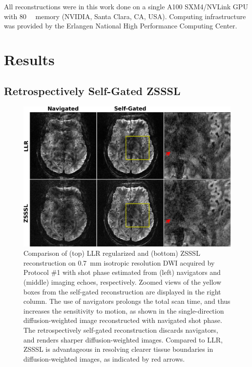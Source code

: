 \documentclass[journal,twoside,web]{ieeecolor}
\begin{document}
	All reconstructions were in this work done on a single A100 SXM4/NVLink GPU
	with \SI{80}{\giga\byte} memory (NVIDIA, Santa Clara, CA, USA).
	Computing infrastructure was provided by
	the Erlangen National High Performance Computing Center.

	\section{Results}

	\subsection{Retrospectively Self-Gated ZSSSL}

	\begin{figure}
		\begin{minipage}[c]{0.75\textwidth}
			\includegraphics[width=\textwidth]{../figures/fig2.png}
		\end{minipage}\hfill
		\begin{minipage}[c]{0.23\textwidth}
			\caption{Comparison of (top) LLR regularized and (bottom) ZSSSL
				reconstruction on 0.7~mm isotropic resolution DWI
				acquired by Protocol \#1
				with shot phase estimated from
				(left) navigators and (middle) imaging echoes, respectively.
				Zoomed views of the yellow boxes from the self-gated reconstruction
				are displayed in the right column.
				The use of navigators prolongs the total scan time,
				and thus increases the sensitivity to motion,
				as shown in the single-direction diffusion-weighted image 
				reconstructed with navigated shot phase.
				The retrospectively self-gated reconstruction discards navigators,
				and renders sharper diffusion-weighted images. 
				Compared to LLR, ZSSSL is advantageous
				in resolving clearer tissue boundaries 
				in diffusion-weighted images,
				as indicated by red arrows.}
				\label{FIG:MOTION_RETRO_TRA}
		\end{minipage}
	\end{figure}
\end{document}
